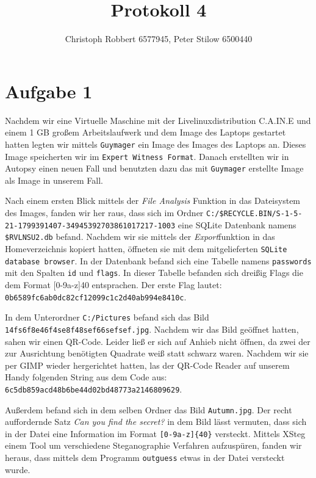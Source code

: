 \documentclass[10pt,a4paper]{article}
\author{Christoph Robbert 6577945, Peter Stilow 6500440}
\title{Protokoll 4}
\begin{document}
\maketitle
 
\section*{Aufgabe 1}
Nachdem wir eine Virtuelle Maschine mit der Livelinuxdistribution C.A.IN.E und einem 1 GB großem Arbeitslaufwerk und dem Image des Laptops gestartet hatten legten wir mittels \texttt{Guymager} ein Image des Images des Laptops an. Dieses Image speicherten wir im \texttt{Expert Witness Format}. Danach erstellten wir in Autopsy einen neuen Fall und benutzten dazu das mit \texttt{Guymager} erstellte Image als Image in unserem Fall. 

Nach einem ersten Blick mittels der \textit{File Analysis} Funktion in das Dateisystem des Images, fanden wir her raus, dass sich im Ordner \texttt{C:/\$RECYCLE.BIN/S-1-5-21-1799391407-34945392703861017217-1003} eine SQLite Datenbank namens \texttt{\$RVLNSU2.db} befand. Nachdem wir sie mittels der \textit{Export}funktion in das Homeverzeichnis kopiert hatten, öffneten sie mit dem mitgelieferten \texttt{SQLite database browser}. In der Datenbank befand sich eine Tabelle namens \texttt{passwords} mit den Spalten \texttt{id} und \texttt{flags}. In dieser Tabelle befanden sich dreißig Flags die dem Format [0-9a-z]{40} entsprachen. Der erste Flag lautet: \texttt{0b6589fc6ab0dc82cf12099c1c2d40ab994e8410c}.

In dem Unterordner \texttt{C:/Pictures} befand sich das Bild \texttt{14fs6f8e46f4se8f48sef66sefsef.jpg}. Nachdem wir das Bild geöffnet hatten, sahen wir einen QR-Code. Leider ließ er sich auf Anhieb nicht öffnen, da zwei der zur Ausrichtung benötigten Quadrate weiß statt schwarz waren. Nachdem wir sie per GIMP wieder hergerichtet hatten, las der QR-Code Reader auf unserem Handy folgenden String aus dem Code aus:
\texttt{6c5db859acd48b6be44d02bd48773a2146809629}.

Außerdem befand sich in dem selben Ordner das Bild \texttt{Autumn.jpg}. Der recht auffordernde Satz \textit{Can you find the secret?} in dem Bild lässt vermuten, dass sich in der Datei eine Information im Format \texttt{[0-9a-z]\{40\}} versteckt. Mittels XSteg einem Tool um verschiedene Steganographie Verfahren aufzuspüren, fanden wir heraus, dass mittels dem Programm \texttt{outguess} etwas in der Datei versteckt wurde.  
\end{document}
